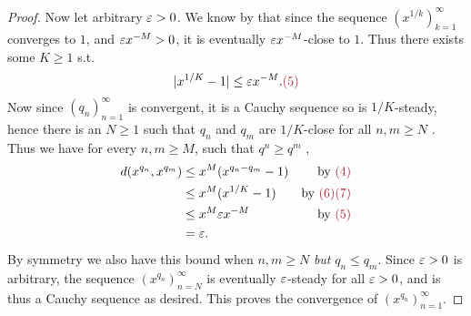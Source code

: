 \begin{proof}
Now let arbitrary \(\varepsilon > 0\).
We know by  that since the sequence \((x^{1/k})_{k=1}^{\infty}\) converges to \(1\), and \(\varepsilon x^{-M} > 0\), it is eventually \(\varepsilon x^{-M}\)-close to \(1\).
Thus there exists some \(K \ge 1\) s.t.
\[
    \abs{x^{1/K} - 1} \le \varE x^{-M}. \MAROON{(5)}
\]
Now since \((q_n)_{n = 1}^{\infty}\) is convergent, it is a Cauchy sequence so is \(1/K\)-steady,
hence there is an \(N \ge 1\) such that \(q_n\) and \(q_m\) are \(1/K\)-close for all \(n, m \ge N\) .
Thus we have for every \(n, m \ge M\), such that \(q^n \ge q^m\) ,
\begin{align*}
    d(x^{q_n}, x^{q_m}) & \le x^M(x^{q_n - q_m} - 1) & \text{by \MAROON{(4)}} \\
                        & \le x^M(x^{1/K} - 1) & \text{by \MAROON{(6)(7)}} \\
                        & \le x^M \varE x^{-M} & \text{by \MAROON{(5)}} \\
                        & = \varE.
\end{align*}
By symmetry we also have this bound when \(n, m \ge N\) \emph{but} \(q_n \le q_m\).
Since \(\varepsilon > 0\) is arbitrary, the sequence \((x^{q_n})_{n = N}^{\infty}\) is eventually \(\varepsilon\)-steady for all \(\varepsilon > 0\), and is thus a Cauchy sequence as desired.
This proves the convergence of \((x^{q_n})_{n = 1}^{\infty}\).


\end{proof}
